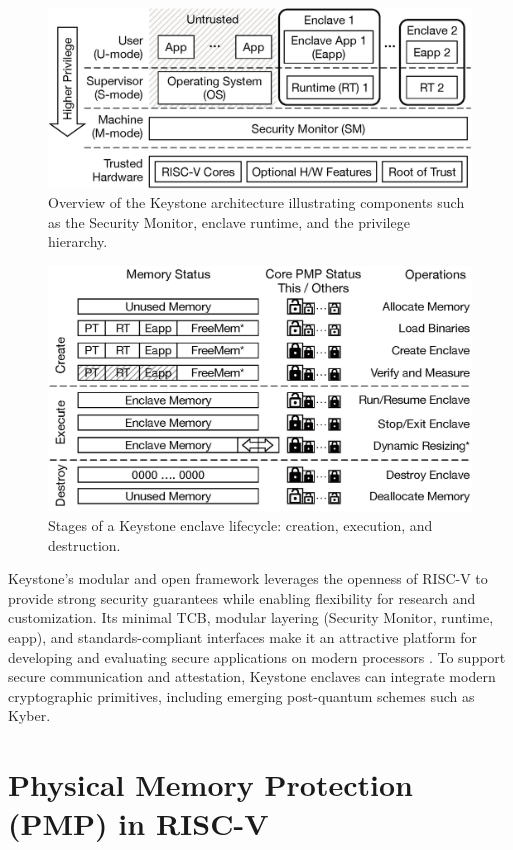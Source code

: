 \begin{figure}[htbp]
\centering
\includegraphics[width=0.9\linewidth]{figures/keystone_overview.png}
\caption{Overview of the Keystone architecture illustrating components such as the Security Monitor, enclave runtime, and the privilege hierarchy.}
\label{fig:keystone_overview}
\end{figure}

\begin{figure}[htbp]
\centering
\includegraphics[width=0.9\linewidth]{figures/enclave_lifecycle.png}
\caption{Stages of a Keystone enclave lifecycle: creation, execution, and destruction.}
\label{fig:enclave_lifecycle}
\end{figure}

Keystone’s modular and open framework leverages the openness of RISC-V to provide strong security guarantees while enabling flexibility for research and customization. Its minimal TCB, modular layering (Security Monitor, runtime, eapp), and standards-compliant interfaces make it an attractive platform for developing and evaluating secure applications on modern processors \cite{dayeol2019keystone}. 
To support secure communication and attestation, Keystone enclaves can integrate modern cryptographic primitives, including emerging post-quantum schemes such as Kyber.

\section{Physical Memory Protection (PMP) in RISC-V}

